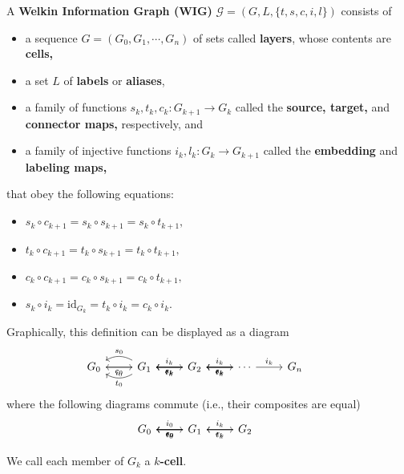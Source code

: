 \begin{definition}
	A \textbf{Welkin Information Graph (WIG)} $\mathcal{G} = (G, L, \{t, s, c, i, l\})$ consists of
  \begin{itemize}
    \item a sequence $G = (G_{0}, G_{1}, \cdots, G_{n})$ of sets called \textbf{layers}, whose contents are \textbf{cells,}
    \item a set $L$ of \textbf{labels} or \textbf{aliases},
    \item a family of functions $s_{k}, t_{k}, c_{k}: G_{k+1} \to G_{k}$ called the \textbf{source, target,} and \textbf{connector maps,} respectively, and
    \item a family of injective functions $i_{k}, l_{k}: G_{k} \to G_{k+1}$ called the \textbf{embedding} and \textbf{labeling maps,}
   \end{itemize}
  that obey the following equations:
  \begin{itemize}
    \item $s_{k} \circ c_{k + 1} = s_{k} \circ s_{k+1} = s_{k} \circ t_{k+1},$
    \item $t_{k} \circ c_{k + 1} = t_{k} \circ s_{k+1} = t_{k} \circ t_{k+1},$
    \item $c_{k} \circ c_{k + 1} = c_{k} \circ s_{k+1} = c_{k} \circ t_{k+1},$
    \item $s_{k} \circ i_{k} = \textrm{id}_{G_{k}} = t_{k} \circ i_{k} = c_{k} \circ i_{k}.$
  \end{itemize}
  Graphically, this definition can be displayed as a diagram
\begin{equation*}
  \begin{tikzcd}
  G_0 \arrow[r,"i_{0}"'] &
  G_1 \arrow[r, "i_k"] \arrow[l, "s_0"', bend right] \arrow[l, "t_0", bend left] \arrow[l, "c_0"] &
  G_2 \arrow[r, "i_k"] \arrow[l, "s_k"] \arrow[l, "t_k"] \arrow[l, "c_k"] &
  \cdots \arrow[r, "i_k"] \arrow[l, "s_k"] \arrow[l, "t_k"] \arrow[l, "c_k"] &
  G_n &
\end{tikzcd}
\end{equation*}
where the following diagrams commute (i.e., their composites are equal)
\begin{equation*}
  \begin{tikzcd}
  G_0 \arrow[r,"i_{0}"] &
  G_1 \arrow[r, "i_k"] \arrow[l, "s_0"] \arrow[l, "t_0"] \arrow[l, "c_0"] &
  G_2 \arrow[l, "t_k"] \arrow[l, "c_k"] &
\end{tikzcd}
\end{equation*}

  We call each member of $G_{k}$ a $k$\textbf{-cell}.
\end{definition}

